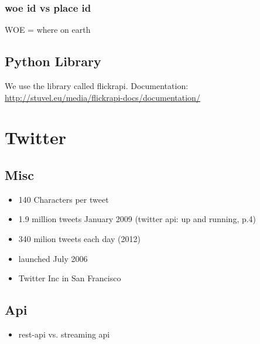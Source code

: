 \documentclass[letterpaper,10pt,english]{sphinxmanual}
\begin{document}
\subsection{woe id vs place id}
\label{flickr:woe-id-vs-place-id}
WOE = where on earth


\section{Python Library}
\label{flickr:python-library}
We use the library called flickrapi. Documentation: \href{http://stuvel.eu/media/flickrapi-docs/documentation/}{http://stuvel.eu/media/flickrapi-docs/documentation/}


\chapter{Twitter}
\label{twitter:twitter}\label{twitter::doc}

\section{Misc}
\label{twitter:misc}\begin{itemize}
\item {} 
140 Characters per tweet

\item {} 
1.9 million tweets January 2009 (twitter api: up and running, p.4)

\item {} 
340 milion tweets each day (2012)

\item {} 
launched July 2006

\item {} 
Twitter Inc in San Francisco

\end{itemize}


\section{Api}
\label{twitter:api}\begin{itemize}
\item {} 
rest-api vs. streaming api

\end{itemize}
\end{document}
